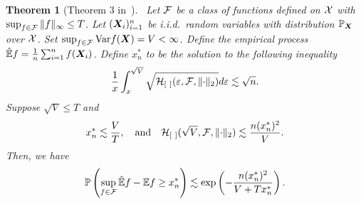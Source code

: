 \documentclass[11pt]{article}
\theoremstyle{plain}
\newtheorem{thm}{Theorem}[section]
\theoremstyle{definition}
\begin{document}
\begin{thm}[Theorem 3 in~\cite{shen1994convergence}]~\label{thm:refer}Let $\mathcal{F}$ be a class of functions defined on $\mathcal{X}$ with $\sup_{f\in\mathcal{F}}\|f\|_{\infty}\leq T$. Let $(\bm X_i)_{i=1}^n$ be i.i.d.\ random variables with distribution $\mathbb{P}_{\bm X}$ over $\mathcal{X}$. Set $\sup_{f\in\mathcal{F}}\textup{Var}f(\bm X)=V<\infty$. 
Define the empirical process $\mathbb{\hat E}f={1\over n}\sum_{i=1}^n f(\bm X_i)$. 
Define $x_n^*$ to be the solution to the following inequality
\[
{1\over x}\int_x^{\sqrt{V}}\sqrt{\tH_{[\ ]}(\varepsilon,\tF,\vnormSize{}{\cdot})}d\varepsilon \lesssim \sqrt{n}.
\]
Suppose $\sqrt{V}\leq T$ and 
\[
x_n^*\lesssim {V\over T},\quad \text{and}\quad \mathcal{H}_{[\ ]}(\sqrt{V},\mathcal{F},\lVert\cdot\rVert_2)\lesssim {n(x_n^*)^2 \over V}.
\]
Then, we have
\begin{equation}\label{eq:oneside}
\mathbb{P}\left(\sup_{f\in\mathcal{F}}\mathbb{\hat E}f -\mathbb{E}f\geq x^*_n\right)\lesssim  \exp\left(-{n (x^*_n)^2\over V+Tx^*_n}\right). 
\end{equation}
\end{thm}
\end{document}
